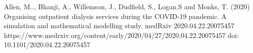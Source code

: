Allen, M.., Bhanji, A., Willemson, J., Dudfield, S., Logan.S and Monks, T. (2020) Organising outpatient dialysis services during the COVID-19 pandemic. A simulation and mathematical modelling study. medRxiv 2020.04.22.20075457 https://www.medrxiv.org/content/early/2020/04/27/2020.04.22.20075457 doi: 10.1101/2020.04.22.20075457
